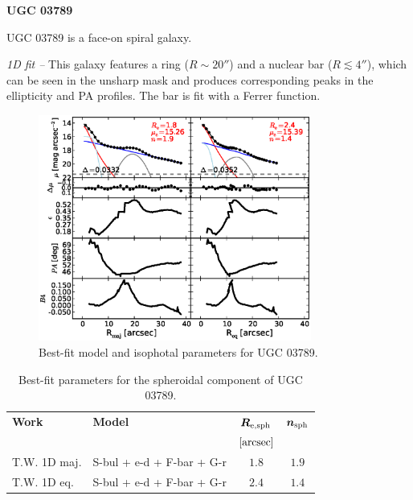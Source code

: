 \documentclass[preprint2]{emulateapj}
\newcommand{\fitfigurewidth}{0.8\textwidth}
\begin{document}
  \clearpage\newpage\noindent
  {\bf UGC 03789 \\}

  UGC 03789 is a face-on spiral galaxy.

  \emph{1D fit -- }
  This galaxy features a ring ($R \sim 20''$) and a nuclear bar ($R \lesssim 4''$),
  which can be seen in the unsharp mask and produces corresponding peaks in the ellipticity and PA profiles.
  The bar is fit with a Ferrer function.

  \begin{figure}[h]
  \begin{center}
  \includegraphics[width=\fitfigurewidth]{images/ugc03789_1Dfit.eps}
  \caption{Best-fit model and isophotal parameters for UGC 03789.}
  \end{center}
  \end{figure}

  \begin{table}[h]
  \small
  \caption{Best-fit parameters for the spheroidal component of UGC 03789.}
  \begin{center}
  \begin{tabular}{llcc}
  \hline
  {\bf Work} & {\bf Model}   & $\bm R_{\rm e,sph}$    & $\bm n_{\rm sph}$ \\
    &  &  $[\rm arcsec]$ & \\
  \hline
  T.W. 1D maj. & S-bul + e-d + F-bar + G-r & $1.8$  &  $1.9$ \\
  T.W. 1D eq.  & S-bul + e-d + F-bar + G-r & $2.4$  &  $1.4$ \\
  \hline
  \end{tabular}
  \end{center}
  \label{tab:ugc3789}
  \end{table}
\end{document}
